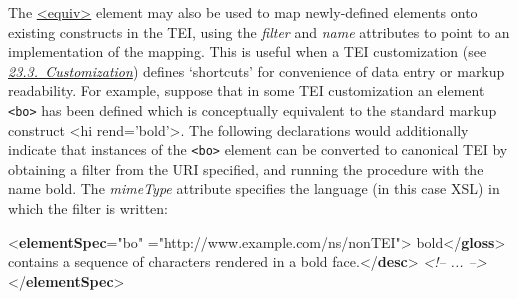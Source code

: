 The \hyperref[TEI.equiv]{<equiv>} element may also be used to map newly-defined elements onto existing constructs in the TEI, using the {\itshape filter} and {\itshape name} attributes to point to an implementation of the mapping. This is useful when a TEI customization (see \textit{\hyperref[MD]{23.3.\ Customization}}) defines ‘shortcuts’ for convenience of data entry or markup readability. For example, suppose that in some TEI customization an element \texttt{<bo>} has been defined which is conceptually equivalent to the standard markup construct <hi rend='bold'>. The following declarations would additionally indicate that instances of the \texttt{<bo>} element can be converted to canonical TEI by obtaining a filter from the URI specified, and running the procedure with the name \textsf{bold}. The {\itshape mimeType} attribute specifies the language (in this case XSL) in which the filter is written: \par\bgroup{}\exampleFont \begin{shaded}\noindent\mbox{}{<\textbf{elementSpec}\hspace*{1em}{ident}="{bo}"\mbox{}\newline 
\hspace*{1em}{ns}="{http://www.example.com/ns/nonTEI}">}\mbox{}\newline 
{}\mbox{}\newline 
{}bold{</\textbf{gloss}>}\mbox{}\newline 
{}contains a sequence of characters rendered in a bold face.{</\textbf{desc}>}\mbox{}\newline 
\textit{<!-- ... -->}\mbox{}\newline 
{</\textbf{elementSpec}>}\end{shaded}\egroup\par \par
